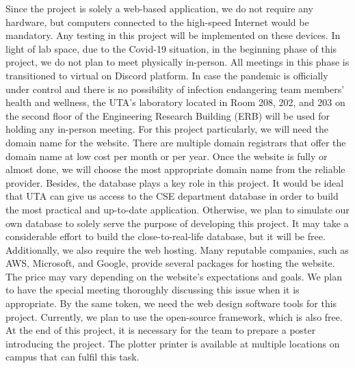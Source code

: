 Since the project is solely a web-based application, we do not require any hardware, but computers connected to the high-speed Internet would be mandatory. Any testing in this project will be implemented on these devices. In light of lab space, due to the Covid-19 situation, in the beginning phase of this project, we do not plan to meet physically in-person. All meetings in this phase is transitioned to virtual on Discord platform. In case the pandemic is officially under control and there is no possibility of infection endangering team members' health and wellness, the UTA's laboratory located in Room 208, 202, and 203 on the second floor of the Engineering Research Building (ERB) will be used for holding any in-person meeting. For this project particularly, we will need the domain name for the website. There are multiple domain registrars that offer the domain name at low cost per month or per year. Once the website is fully or almost done, we will choose the most appropriate domain name from the reliable provider. Besides, the database plays a key role in this project. It would be ideal that UTA can give us access to the CSE department database in order to build the most practical and up-to-date application. Otherwise, we plan to simulate our own database to solely serve the purpose of developing this project. It may take a considerable effort to build the close-to-real-life database, but it will be free. Additionally, we also require the web hosting. Many reputable companies, such as AWS, Microsoft, and Google, provide several packages for hosting the website. The price may vary depending on the website's expectations and goals. We plan to have the special meeting thoroughly discussing this issue when it is appropriate. By the same token, we need the web design software tools for this project. Currently, we plan to use the open-source framework, which is also free. At the end of this project, it is necessary for the team to prepare a poster introducing the project. The plotter printer is available at multiple locations on campus that can fulfil this task. 